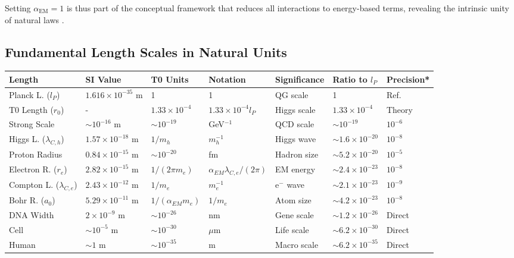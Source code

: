 \documentclass[12pt,a4paper]{article}
\newcommand{\alphaEM}{\alpha_{\text{EM}}}
\begin{document}
	Setting $\alphaEM = 1$ is thus part of the conceptual framework that reduces all interactions to energy-based terms, revealing the intrinsic unity of natural laws \cite{pascher_alphabeta_2025}.
	
\subsection{Fundamental Length Scales in Natural Units}

\begin{table}[ht]
	\centering
	\begin{adjustbox}{scale=0.7}
		\begin{tabular}{lllllll}
			\hline
			\textbf{Length} & \textbf{SI Value} & \textbf{T0 Units} & \textbf{Notation} & \textbf{Significance} & \textbf{Ratio to $l_P$} & \textbf{Precision*} \\
			\hline
			Planck L. ($l_P$) & $1.616 \times 10^{-35}$ m & 1 & 1 & QG scale & 1 & Ref. \\
			T0 Length ($r_0$) & - & $1.33 \times 10^{-4}$ & $1.33 \times 10^{-4} l_P$ & Higgs scale & $1.33 \times 10^{-4}$ & Theory \\
			Strong Scale & $\sim 10^{-16}$ m & $\sim 10^{-19}$ & GeV$^{-1}$ & QCD scale & $\sim 10^{-19}$ & $10^{-6}$ \\
			Higgs L. ($\lambda_{C,h}$) & $1.57 \times 10^{-18}$ m & $1/m_h$ & $m_h^{-1}$ & Higgs wave & $\sim 1.6 \times 10^{-20}$ & $10^{-8}$ \\
			Proton Radius & $0.84 \times 10^{-15}$ m & $\sim 10^{-20}$ & fm & Hadron size & $\sim 5.2 \times 10^{-20}$ & $10^{-5}$ \\
			Electron R. ($r_e$) & $2.82 \times 10^{-15}$ m & $1/(2\pi m_e)$ & $\alpha_{EM} \lambda_{C,e}/(2\pi)$ & EM energy & $\sim 2.4 \times 10^{-23}$ & $10^{-8}$ \\
			Compton L. ($\lambda_{C,e}$) & $2.43 \times 10^{-12}$ m & $1/m_e$ & $m_e^{-1}$ & e$^-$ wave & $\sim 2.1 \times 10^{-23}$ & $10^{-9}$ \\
			Bohr R. ($a_0$) & $5.29 \times 10^{-11}$ m & $1/(\alpha_{EM} m_e)$ & $1/m_e$ & Atom size & $\sim 4.2 \times 10^{-23}$ & $10^{-8}$ \\
			DNA Width & $2 \times 10^{-9}$ m & $\sim 10^{-26}$ & nm & Gene scale & $\sim 1.2 \times 10^{-26}$ & Direct \\
			Cell & $\sim 10^{-5}$ m & $\sim 10^{-30}$ & $\mu$m & Life scale & $\sim 6.2 \times 10^{-30}$ & Direct \\
			Human & $\sim 1$ m & $\sim 10^{-35}$ & m & Macro scale & $\sim 6.2 \times 10^{-35}$ & Direct \\

\end{tabular}
\end{adjustbox}
\end{table}
\end{document}
